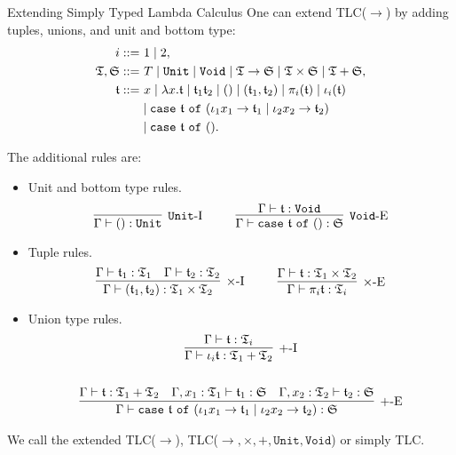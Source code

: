 \begin{frame}[allowframebreaks]{Extending Simply Typed Lambda Calculus}
    One can extend TLC($\rightarrow$) by adding tuples, unions, and unit and bottom type:
    \begin{align*}
    i ::=&~ 1 \mid 2, \\
    \mathfrak{T}, \mathfrak{S} ::=&~ T \mid \mathtt{Unit} \mid \mathtt{Void} \mid \mathfrak{T} \rightarrow \mathfrak{S} \mid \mathfrak{T} \times \mathfrak{S} \mid \mathfrak{T} + \mathfrak{S}, \\
    \mathfrak{t} ::=&~ x \mid \lambda x. \mathfrak{t} \mid \mathfrak{t}_1 \mathfrak{t}_2 \mid () \mid (\mathfrak{t}_1, \mathfrak{t}_2) \mid \pi_i(\mathfrak{t}) \mid \iota_i(\mathfrak{t}) \\ &\mid \mathtt{case}~\mathfrak{t}~\mathtt{of}~(\iota_1 x_1 \rightarrow \mathfrak{t}_1 \mid \iota_2 x_2 \rightarrow \mathfrak{t}_2) \\
    &\mid \mathtt{case}~\mathfrak{t}~\mathtt{of}~().
    \end{align*}
    
    The additional rules are:
    \begin{itemize}
        \item Unit and bottom type rules.
        \[
        \infer[\mathtt{Unit}\mbox{-I}]{\Gamma \vdash () : \mathtt{Unit}}{}
        ~~~~ ~~~~
        \infer[\mathtt{Void}\mbox{-E}]{\Gamma \vdash \mathtt{case}~\t~\mathtt{of}~() : \mathfrak{S}}{\Gamma \vdash \t : \mathtt{Void}}
        \]
        \item Tuple rules.
        \[
        \infer[\times\mbox{-I}]{\Gamma \vdash (\t_1, \t_2) : \T_1 \times \T_2}{\Gamma \vdash \t_1 : \T_1 & \Gamma \vdash \t_2 : \T_2}
        ~~~~ ~~~~
        \infer[\times\mbox{-E}]{\Gamma \vdash \pi_i \t : \T_i}{\Gamma \vdash \t : \T_1 \times \T_2}
        \]
        \item Union type rules.
        \begin{gather*}
        \infer[+\mbox{-I}]{\Gamma \vdash \iota_i \t : \T_1 + \T_2}{\Gamma \vdash \t : \T_i}
        \\ \\
        \infer[+\mbox{-E}]{\Gamma \vdash \mathtt{case}~\t~\mathtt{of}~(\iota_1 x_1 \rightarrow \t_1 \mid \iota_2 x_2 \rightarrow \t_2) : \mathfrak{S}}{
            \Gamma \vdash \t : \T_1 + \T_2
            &
            \Gamma, x_1 : \T_1 \vdash \t_1 : \mathfrak{S}
            &
            \Gamma, x_2 : \T_2 \vdash \t_2 : \mathfrak{S}
        }
        \end{gather*}
    \end{itemize}
    
    We call the extended TLC($\rightarrow$), TLC($\rightarrow, \times, +, \mathtt{Unit}, \mathtt{Void}$) or simply TLC.
\end{frame}


